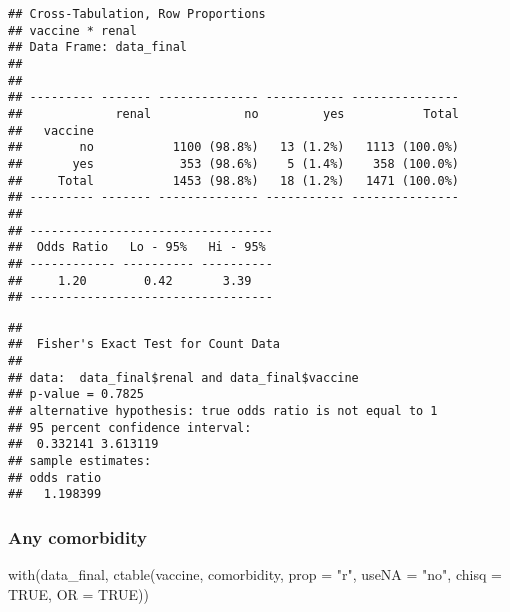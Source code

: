 \documentclass[
]{article}
\newenvironment{Shaded}{\begin{snugshade}}{\end{snugshade}}
\newcommand{\AttributeTok}[1]{\textcolor[rgb]{0.77,0.63,0.00}{#1}}
\newcommand{\ConstantTok}[1]{\textcolor[rgb]{0.00,0.00,0.00}{#1}}
\newcommand{\FunctionTok}[1]{\textcolor[rgb]{0.00,0.00,0.00}{#1}}
\newcommand{\NormalTok}[1]{#1}
\newcommand{\SpecialCharTok}[1]{\textcolor[rgb]{0.00,0.00,0.00}{#1}}
\newcommand{\StringTok}[1]{\textcolor[rgb]{0.31,0.60,0.02}{#1}}
\begin{document}
\begin{verbatim}
## Cross-Tabulation, Row Proportions  
## vaccine * renal  
## Data Frame: data_final  
## 
## 
## --------- ------- -------------- ----------- ---------------
##             renal             no         yes           Total
##   vaccine                                                   
##        no           1100 (98.8%)   13 (1.2%)   1113 (100.0%)
##       yes            353 (98.6%)    5 (1.4%)    358 (100.0%)
##     Total           1453 (98.8%)   18 (1.2%)   1471 (100.0%)
## --------- ------- -------------- ----------- ---------------
## 
## ----------------------------------
##  Odds Ratio   Lo - 95%   Hi - 95% 
## ------------ ---------- ----------
##     1.20        0.42       3.39   
## ----------------------------------
\end{verbatim}

\begin{Shaded}
\end{Shaded}

\begin{verbatim}
## 
##  Fisher's Exact Test for Count Data
## 
## data:  data_final$renal and data_final$vaccine
## p-value = 0.7825
## alternative hypothesis: true odds ratio is not equal to 1
## 95 percent confidence interval:
##  0.332141 3.613119
## sample estimates:
## odds ratio 
##   1.198399
\end{verbatim}

\hypertarget{any-comorbidity}{%
\subsubsection{Any comorbidity}\label{any-comorbidity}}

\begin{Shaded}
\begin{Highlighting}[]
\FunctionTok{with}\NormalTok{(data\_final, }\FunctionTok{ctable}\NormalTok{(vaccine, comorbidity, }\AttributeTok{prop =} \StringTok{"r"}\NormalTok{, }\AttributeTok{useNA =} \StringTok{"no"}\NormalTok{, }\AttributeTok{chisq =} \ConstantTok{TRUE}\NormalTok{, }\AttributeTok{OR =} \ConstantTok{TRUE}\NormalTok{))}
\end{Highlighting}
\end{Shaded}
\end{document}
